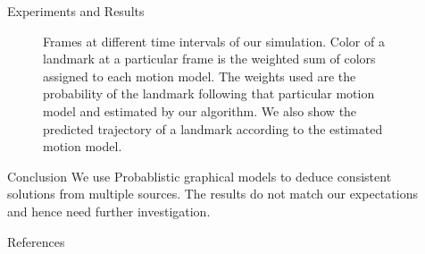\documentclass[final]{beamer}
\newlength{\sepwid}
\newlength{\onecolwid}
\begin{document}
\begin{frame}[t]
\begin{columns}[t]
\begin{column}{\onecolwid}
      \begin{block}{Experiments and Results}
        \begin{figure}
          \newlength{\imgwidth}
          \setlength{\imgwidth}{\textwidth}
          \centering
          \tikzset{/tikz/x=0.08\linewidth}
          \tikzset{/tikz/y=0.08\linewidth}
          \caption{ Frames at different time intervals of our simulation.
      Color of a landmark at a particular frame is the weighted sum of colors
      assigned to each motion model. The weights used are the probability of the
    landmark following that particular motion model and estimated by our algorithm. We also show the predicted trajectory of a landmark according to the estimated motion model.}
          \label{fig:graphmodel}
        \end{figure}
      \end{block}
      \begin{block}{Conclusion}
        We use Probablistic graphical models to deduce consistent solutions from multiple sources. The results do not match our expectations and hence need further investigation.
      \end{block}
      \begin{block}{References}
        {\small
          
          
        }
      \end{block}
    \end{column}

  \begin{column}{\sepwid}\end{column}			%

  \end{columns}
\end{frame}
\end{document}
